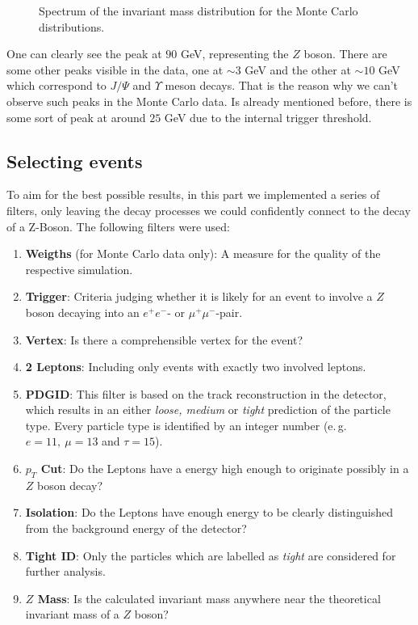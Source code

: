 \documentclass[twocolumn,
			   showpacs,%
               nofootinbib,
               aps,%
               prd,
               notitlepage,
               showkeys,
               10pt]{revtex4-1}
\begin{document}
\begin{figure}[H]
	\centering
	\caption{Spectrum of the invariant mass distribution for the Monte Carlo distributions.}
\end{figure}
One can clearly see the peak at $90$ GeV, representing the $Z$ boson. There are some other peaks visible in the data, one at $\sim 3$ GeV and the other at $\sim 10$ GeV which correspond to $J/\Psi$ and $\Upsilon$ meson decays. That is the reason why we can't observe such peaks in the Monte Carlo data. Is already mentioned before, there is some sort of peak at around $25$ GeV due to the internal trigger threshold.

\subsection{Selecting events}
To aim for the best possible results, in this part we implemented a series of filters, only leaving the decay processes we could confidently connect to the decay of a Z-Boson.
The following filters were used:
\begin{enumerate}
\item \textbf{Weigths} (for Monte Carlo data only): A measure for the quality of the respective simulation.
\item \textbf{Trigger}: Criteria judging whether it is likely for an event to involve a $Z$ boson decaying into an $e^{+}e^{-}$- or $\mu^{+}\mu^{-}$-pair.
\item \textbf{Vertex}: Is there a comprehensible vertex for the event?
\item \textbf{2 Leptons}: Including only events with exactly two involved leptons.
\item \textbf{PDGID}: This filter is based on the track reconstruction in the detector, which results in an either \textit{loose, medium} or \textit{tight} prediction of the particle type. Every particle type is identified by an integer number (e.\,g. $e = 11 , \ \mu = 13$ and $\tau = 15$).
\item \textbf{$p_T$ Cut}: Do the Leptons have a energy high enough to originate possibly in a $Z$ boson decay?
\item \textbf{Isolation}: Do the Leptons have enough energy to be clearly distinguished from the background energy of the detector? 
\item \textbf{Tight ID}: Only the particles which are labelled as \textit{tight} are considered for further analysis.
\item \textbf{$Z$ Mass}: Is the calculated invariant mass anywhere near the theoretical invariant mass of a $Z$ boson?
\end{enumerate}
\end{document}
